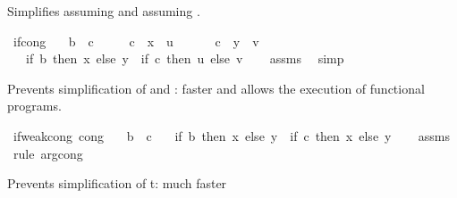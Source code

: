 \begin{isabellebody}
\endisatagML
{\isafoldML}%
%
\isadelimML
%
\endisadelimML
%
\begin{isamarkuptext}%
Simplifies  assuming  and  assuming .%
\end{isamarkuptext}\isamarkuptrue%
\isamarkupfalse%
\ if{\isacharunderscore}{\kern0pt}cong{\isacharcolon}{\kern0pt}\isanewline
\ \ \ {\isachardoublequoteopen}b\ {\isacharequal}{\kern0pt}\ c{\isachardoublequoteclose}\isanewline
\ \ \ \ \ {\isachardoublequoteopen}c\ {\isasymLongrightarrow}\ x\ {\isacharequal}{\kern0pt}\ u{\isachardoublequoteclose}\isanewline
\ \ \ \ \ {\isachardoublequoteopen}{\isasymnot}\ c\ {\isasymLongrightarrow}\ y\ {\isacharequal}{\kern0pt}\ v{\isachardoublequoteclose}\isanewline
\ \ \ {\isachardoublequoteopen}{\isacharparenleft}{\kern0pt}if\ b\ then\ x\ else\ y{\isacharparenright}{\kern0pt}\ {\isacharequal}{\kern0pt}\ {\isacharparenleft}{\kern0pt}if\ c\ then\ u\ else\ v{\isacharparenright}{\kern0pt}{\isachardoublequoteclose}\isanewline
%
\isadelimproof
\ \ %
\endisadelimproof
%
\isatagproof
{}\isamarkupfalse%
\ assms\ \isamarkupfalse%
\ simp%
\endisatagproof
{\isafoldproof}%
%
\isadelimproof
%
\endisadelimproof
%
\begin{isamarkuptext}%
Prevents simplification of  and :
  faster and allows the execution of functional programs.%
\end{isamarkuptext}\isamarkuptrue%
\isamarkupfalse%
\ if{\isacharunderscore}{\kern0pt}weak{\isacharunderscore}{\kern0pt}cong\ {\isacharbrackleft}{\kern0pt}cong{\isacharbrackright}{\kern0pt}{\isacharcolon}{\kern0pt}\isanewline
\ \ \ {\isachardoublequoteopen}b\ {\isacharequal}{\kern0pt}\ c{\isachardoublequoteclose}\isanewline
\ \ \ {\isachardoublequoteopen}{\isacharparenleft}{\kern0pt}if\ b\ then\ x\ else\ y{\isacharparenright}{\kern0pt}\ {\isacharequal}{\kern0pt}\ {\isacharparenleft}{\kern0pt}if\ c\ then\ x\ else\ y{\isacharparenright}{\kern0pt}{\isachardoublequoteclose}\isanewline
%
\isadelimproof
\ \ %
\endisadelimproof
%
\isatagproof
{}\isamarkupfalse%
\ assms\ \isamarkupfalse%
\ {\isacharparenleft}{\kern0pt}rule\ arg{\isacharunderscore}{\kern0pt}cong{\isacharparenright}{\kern0pt}%
\endisatagproof
{\isafoldproof}%
%
\isadelimproof
%
\endisadelimproof
%
\begin{isamarkuptext}%
Prevents simplification of t: much faster%
\end{isamarkuptext}\isamarkuptrue%

\end{isabellebody}
